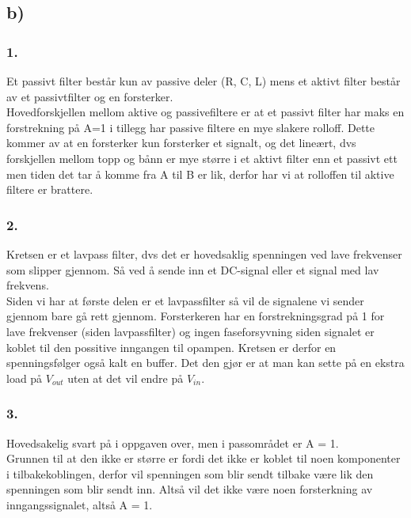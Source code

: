 \documentclass[a4paper, norsk, twoside, 10pt]{article}
\begin{document}
\subsection*{b)}
\subsubsection*{1.}
Et passivt filter består kun av passive deler (R, C, L) mens et aktivt filter består av et passivtfilter og en forsterker. \\
Hovedforskjellen mellom aktive og passivefiltere er at et passivt filter har maks en forstrekning på A=1 i tillegg har passive filtere en mye slakere rolloff. Dette kommer av at en forsterker kun forsterker et signalt, og det lineært, dvs forskjellen mellom topp og bånn er mye større i et aktivt filter enn et passivt ett men tiden det tar å komme fra A til B er lik, derfor har vi at rolloffen til aktive filtere er brattere.

\subsubsection*{2.}
Kretsen er et lavpass filter, dvs det er hovedsaklig spenningen ved lave frekvenser som slipper gjennom. Så ved å sende inn et DC-signal eller et signal med lav frekvens. \\
Siden vi har at første delen er et lavpassfilter så vil de signalene vi sender gjennom bare gå rett gjennom. Forsterkeren har en forstrekningsgrad på 1 for lave frekvenser (siden lavpassfilter) og ingen faseforsyvning siden signalet er koblet til den possitive inngangen til opampen. Kretsen er derfor en spenningsfølger også kalt en buffer. Det den gjør er at man kan sette på en ekstra load på $V_{out}$ uten at det vil endre på $V_{in}$.



\subsubsection*{3.}
Hovedsakelig svart på i oppgaven over, men i passområdet er A = 1. \\
Grunnen til at den ikke er større er fordi det ikke er koblet til noen komponenter i tilbakekoblingen, derfor vil spenningen som blir sendt tilbake være lik den spenningen som blir sendt inn. Altså vil det ikke være noen forsterkning av inngangssignalet, altså A = 1.
\end{document}
